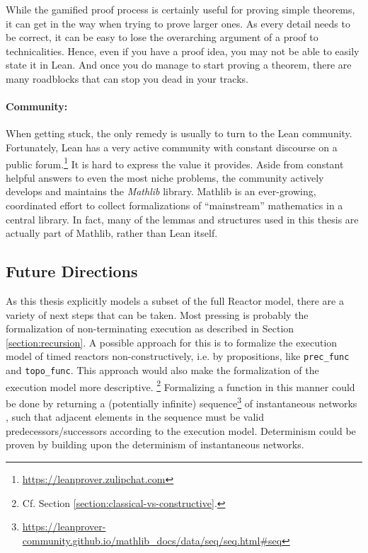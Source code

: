 \noindent While the gamified proof process is certainly useful for proving simple theorems, it can get in the way when trying to prove larger ones.
As every detail needs to be correct, it can be easy to lose the overarching argument of a proof to technicalities.
Hence, even if you have a proof idea, you may not be able to easily state it in Lean.
And once you do manage to start proving a theorem, there are many roadblocks that can stop you dead in your tracks.

\paragraph{Community:}

When getting stuck, the only remedy is usually to turn to the Lean community.
Fortunately, Lean has a very active community with constant discourse on a public forum.\footnote{
    \url{https://leanprover.zulipchat.com}
}
It is hard to express the value it provides.
Aside from constant helpful answers to even the most niche problems, the community actively develops and maintains the \emph{Mathlib} library.
Mathlib is an ever-growing, coordinated effort to collect formalizations of ``mainstream'' mathematics in a central library.
In fact, many of the lemmas and structures used in this thesis are actually part of Mathlib, rather than Lean itself.

\subsection{Future Directions}
\label{section:future}

As this thesis explicitly models a subset of the full Reactor model, there are a variety of next steps that can be taken.
Most pressing is probably the formalization of non-terminating execution as described in Section \ref{section:recursion}.
A possible approach for this is to formalize the execution model of timed reactors non-constructively, i.e. by propositions, like \lstinline{prec_func} and \lstinline{topo_func}.
This approach would also make the formalization of the execution model more descriptive. \footnote{Cf. Section \ref{section:classical-vs-constructive}.}
Formalizing a function in this manner could be done by returning a (potentially infinite) sequence\footnote{\url{https://leanprover-community.github.io/mathlib_docs/data/seq/seq.html#seq}} of instantaneous networks \cite{flow}, such that adjacent elements in the sequence must be valid predecessors/successors according to the execution model. 
Determinism could be proven by building upon the determinism of instantaneous networks. 

